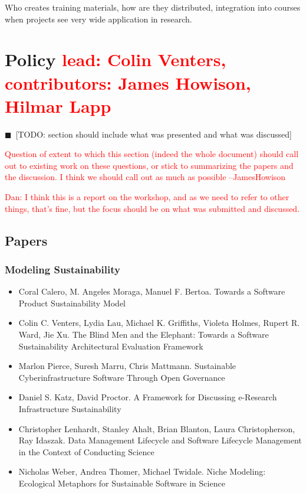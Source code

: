 \documentclass[11pt, oneside]{amsart}
\newcommand{\todo}[1]{{\color{blue}$\blacksquare$~\textsf{[TODO: #1]}}}
\newcommand{\note}[1]{ {\textcolor{red}    { #1 }}}
\begin{document}
Who creates training materials, how are they distributed, integration
into courses when projects see very wide application in research.

\section{Policy \note{lead: Colin Venters, contributors: James Howison, Hilmar Lapp}} \label{sec:policy}

\todo{section should include what was presented and what was discussed}

\note{Question of extent to which this section (indeed the whole document) should call out to existing work on these questions, or stick to summarizing the papers and the discussion. I think we should call out as much as possible --JamesHowison}

\note{Dan: I think this is a report on the workshop, and as we need to refer to other things, that's fine, but the focus should be on what was submitted and discussed.}

\subsection*{Papers}

\subsubsection*{Modeling Sustainability}

\begin{itemize}

\item Coral Calero, M. Angeles Moraga, Manuel F. Bertoa. Towards a
  Software Product Sustainability Model \cite{Calero_WSSSPE}

\item Colin C. Venters, Lydia Lau, Michael K. Griffiths, Violeta
  Holmes, Rupert R. Ward, Jie Xu. The Blind Men and the Elephant:
  Towards a Software Sustainability Architectural Evaluation Framework
  \cite{Venters_WSSSPE}

\item Marlon Pierce, Suresh Marru, Chris Mattmann. Sustainable
  Cyberinfrastructure Software Through Open Governance
  \cite{Pierce_WSSSPE}

\item Daniel S. Katz, David Proctor. A Framework for Discussing
  e-Research Infrastructure Sustainability \cite{Katz_WSSSPE}

\item Christopher Lenhardt, Stanley Ahalt, Brian Blanton, Laura
  Christopherson, Ray Idaszak. Data Management Lifecycle and Software
  Lifecycle Management in the Context of Conducting Science
  \cite{Lenhardt_WSSSPE}

\item Nicholas Weber, Andrea Thomer, Michael Twidale. Niche Modeling:
  Ecological Metaphors for Sustainable Software in Science
  \cite{Weber_WSSSPE}

\end{itemize}
\end{document}
